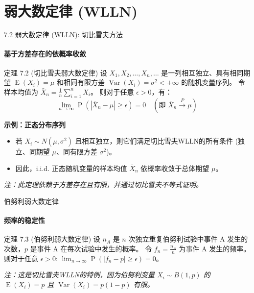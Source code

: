 \documentclass[UTF8]{beamer}
\DeclareMathOperator{\E}{\operatorname{E}}
\DeclareMathOperator{\Var}{\operatorname{Var}}
\DeclareMathOperator{\Prob}{\operatorname{P}}
\begin{document}
\section{弱大数定律 (WLLN)}
\begin{frame}[shrink=5]{7.2 弱大数定律 (WLLN): 切比雪夫方法}
    \framesubtitle{基于方差存在的依概率收敛}
    \begin{block}{定理 7.2 (切比雪夫弱大数定律)}
        设 $X_1, X_2, \dots, X_n, \dots$ 是一列\alert{相互独立}、具有相同期望 $\E(X_i) = \mu$ 和相同\alert{有限方差} $\Var(X_i) = \sigma^2 < +\infty$ 的随机变量序列。
        令样本均值为 $\bar{X}_n = \frac{1}{n} \sum_{i=1}^{n} X_i$。
        则对于任意 $\epsilon > 0$，有：
        \[ \lim_{n \to \infty} \Prob(|\bar{X}_n - \mu| \geq \epsilon) = 0 \quad (\text{即 } \bar{X}_n \xrightarrow{P} \mu) \]
    \end{block}
    \pause
    \textbf{示例：正态分布序列}
    \begin{itemize}
        \item 若 $X_i \sim N(\mu, \sigma^2)$ 且相互独立，则它们满足切比雪夫WLLN的\alert{所有条件} (独立、同期望 $\mu$、同有限方差 $\sigma^2$)。
        \item 因此，i.i.d. 正态随机变量的样本均值 $\bar{X}_n$ \alert{依概率收敛}于总体期望 $\mu$。
    \end{itemize}
    \footnotesize
    \textit{注：此定理依赖于方差存在且有限，并通过切比雪夫不等式证明。}
\end{frame}

\begin{frame}{伯努利弱大数定律}
    \framesubtitle{频率的稳定性}
    \begin{block}{定理 7.3 (伯努利弱大数定律)}
        设 $n_A$ 是 $n$ 次独立重复伯努利试验中事件 A 发生的次数，$p$ 是事件 A 在每次试验中发生的概率。
        令 $f_n = \frac{n_A}{n}$ 为事件 A 发生的频率。
        则对于任意 $\epsilon > 0$: $\lim_{n \to \infty} \Prob\left(\left| f_n - p \right| \geq \epsilon\right) = 0$。
    \end{block}
    \textit{注：这是切比雪夫WLLN的特例，因为伯努利变量 $X_i \sim B(1,p)$ 的 $\E(X_i)=p$ 且 $\Var(X_i)=p(1-p)$ 有限。}
\end{frame}
\end{document}
